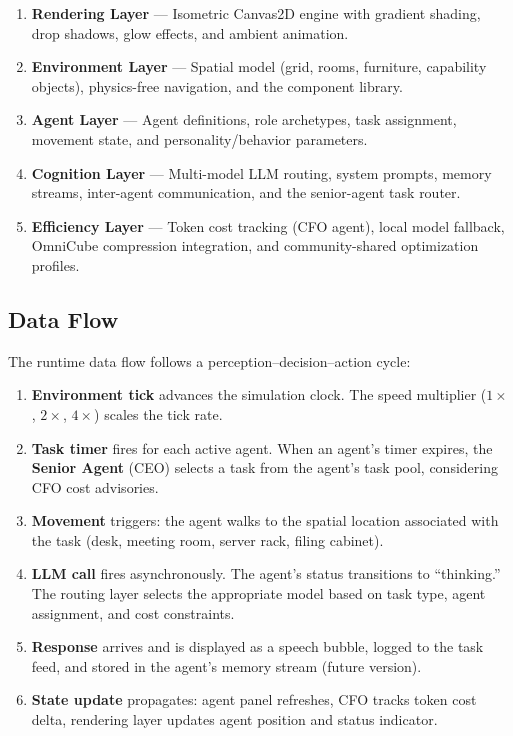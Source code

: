 \documentclass[11pt,letterpaper]{article}
\begin{document}
\begin{archbox}
\begin{enumerate}[leftmargin=1.5em,itemsep=2pt]
  \item \textbf{Rendering Layer} --- Isometric Canvas2D engine with gradient shading, drop shadows, glow effects, and ambient animation.
  \item \textbf{Environment Layer} --- Spatial model (grid, rooms, furniture, capability objects), physics-free navigation, and the component library.
  \item \textbf{Agent Layer} --- Agent definitions, role archetypes, task assignment, movement state, and personality/behavior parameters.
  \item \textbf{Cognition Layer} --- Multi-model LLM routing, system prompts, memory streams, inter-agent communication, and the senior-agent task router.
  \item \textbf{Efficiency Layer} --- Token cost tracking (CFO agent), local model fallback, OmniCube compression integration, and community-shared optimization profiles.
\end{enumerate}
\end{archbox}

\subsection{Data Flow}

The runtime data flow follows a perception--decision--action cycle:

\begin{enumerate}[leftmargin=2em]
  \item \textbf{Environment tick} advances the simulation clock. The speed multiplier ($1\times$, $2\times$, $4\times$) scales the tick rate.
  \item \textbf{Task timer} fires for each active agent. When an agent's timer expires, the \textbf{Senior Agent} (CEO) selects a task from the agent's task pool, considering CFO cost advisories.
  \item \textbf{Movement} triggers: the agent walks to the spatial location associated with the task (desk, meeting room, server rack, filing cabinet).
  \item \textbf{LLM call} fires asynchronously. The agent's status transitions to ``thinking.'' The routing layer selects the appropriate model based on task type, agent assignment, and cost constraints.
  \item \textbf{Response} arrives and is displayed as a speech bubble, logged to the task feed, and stored in the agent's memory stream (future version).
  \item \textbf{State update} propagates: agent panel refreshes, CFO tracks token cost delta, rendering layer updates agent position and status indicator.
\end{enumerate}
\end{document}

